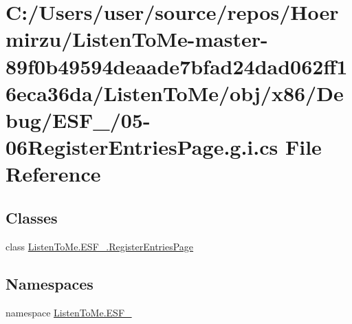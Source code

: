 \hypertarget{05-06_register_entries_page_8g_8i_8cs}{}\section{C\+:/\+Users/user/source/repos/\+Hoermirzu/\+Listen\+To\+Me-\/master-\/89f0b49594deaade7bfad24dad062ff16eca36da/\+Listen\+To\+Me/obj/x86/\+Debug/\+E\+S\+F\+\_/05-\/06\+Register\+Entries\+Page.g.\+i.\+cs File Reference}
\label{05-06_register_entries_page_8g_8i_8cs}
\subsection*{Classes}
\begin{DoxyCompactItemize}
\item 
class \hyperlink{class_listen_to_me_1_1_e_s_f__2_1_1_register_entries_page}{Listen\+To\+Me.\+E\+S\+F\+\_.\+Register\+Entries\+Page}
\end{DoxyCompactItemize}
\subsection*{Namespaces}
\begin{DoxyCompactItemize}
\item 
namespace \hyperlink{namespace_listen_to_me_1_1_e_s_f__2}{Listen\+To\+Me.\+E\+S\+F\+\_}
\end{DoxyCompactItemize}
